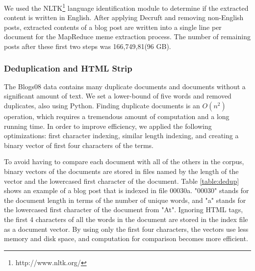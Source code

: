 \documentclass{sig-alternate}
\begin{document}
We used the NLTK\footnote{http://www.nltk.org/} language identification module to determine if the extracted content is written in English. After applying Decruft and removing non-English posts, extracted contents of a blog post are written into a single line per document for the MapReduce meme extraction process. The number of remaining posts after these first two steps was 166,749,81(96 GB).

\subsubsection{Deduplication and HTML Strip}

The Blogs08 data contains many duplicate documents and documents without a significant amount of text. We set a lower-bound of five words and removed duplicates, also using Python. Finding duplicate documents is an $O(n^2)$ operation, which requires a tremendous amount of computation and a long running time. In order to improve efficiency, we applied the following optimizations: first character indexing, similar length indexing, and creating a binary vector of first four characters of the terms.

To avoid having to compare each document with all of the others in the corpus, binary vectors of the documents are stored in files named by the length of the vector and the lowercased first character of the document. Table \ref{table:dedup} shows an example of a blog post that is indexed in file 00030a. "00030" stands for the document length in terms of the number of unique words, and "a" stands for the lowercased first character of the document from "At". Ignoring HTML tags, the first 4 characters of all the words in the document are stored in the index file as a document vector. By using only the first four characters, the vectors use less memory and disk space, and computation for comparison becomes more efficient.
\end{document}
